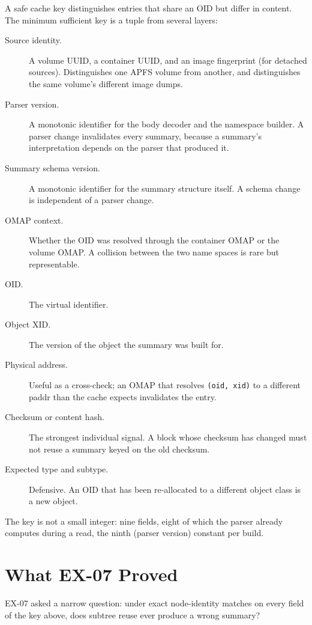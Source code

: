 A safe cache key distinguishes entries that share an OID but
differ in content. The minimum sufficient key is a tuple from
several layers:

\begin{description}
  \item[Source identity.] A volume UUID, a container UUID, and an
    image fingerprint (for detached sources). Distinguishes one
    APFS volume from another, and distinguishes the same volume's
    different image dumps.
  \item[Parser version.] A monotonic identifier for the body decoder
    and the namespace builder. A parser change invalidates every
    summary, because a summary's interpretation depends on the
    parser that produced it.
  \item[Summary schema version.] A monotonic identifier for the
    summary structure itself. A schema change is independent of a
    parser change.
  \item[OMAP context.] Whether the OID was resolved through the
    container OMAP or the volume OMAP. A collision between the two
    name spaces is rare but representable.
  \item[OID.] The virtual identifier.
  \item[Object XID.] The version of the object the summary was built
    for.
  \item[Physical address.] Useful as a cross-check; an OMAP that
    resolves \texttt{(oid, xid)} to a different paddr than the cache
    expects invalidates the entry.
  \item[Checksum or content hash.] The strongest individual signal.
    A block whose checksum has changed must not reuse a summary
    keyed on the old checksum.
  \item[Expected type and subtype.] Defensive. An OID that has been
    re-allocated to a different object class is a new object.
\end{description}

The key is not a small integer: nine fields, eight of which the
parser already computes during a read, the ninth (parser version)
constant per build.

\section{What EX-07 Proved}

EX-07 asked a narrow question: under exact node-identity matches on
every field of the key above, does subtree reuse ever produce a
wrong summary?

